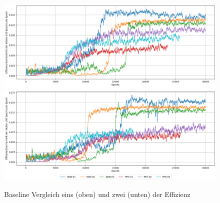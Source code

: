 \begin{figure}[H]
	\centering
	\includegraphics[scale=0.4517]{Abbildungen/Evaluation/effizienz-rate_baseline_01.png}
	\includegraphics[scale=0.4515]{Abbildungen/Evaluation/effizienz-rate_baseline_02.png}
	\caption[Baseline Vergleich Effizienz]{Baseline Vergleich eins (oben) und zwei (unten) der Effizienz}
	\label{fig:Baseline_Effizienz}
\end{figure}

